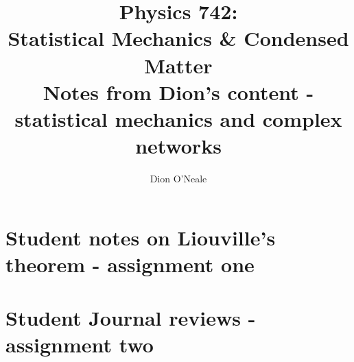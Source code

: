 \documentclass{article}
\title{Physics 742: \\
	Statistical Mechanics \& Condensed Matter\\
	Notes from Dion's content - statistical mechanics and complex networks}
\author{Dion O'Neale}
\begin{document}
\maketitle
\newpage
\tableofcontents
\newpage










\section{Student notes on Liouville's theorem - assignment one}








\section{Student Journal reviews - assignment two}

\end{document}
